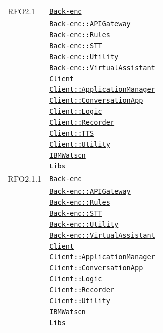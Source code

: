 \begin{longtable}{|>{\centering}m{3cm}|m{10cm}<{\centering}|}
RFO2.1 & \hyperref[Back-end]{\texttt{Back-end}}\\
& \hyperref[Back-end::APIGateway]{\texttt{Back-end::APIGateway}}\\
& \hyperref[Back-end::Rules]{\texttt{Back-end::Rules}}\\
& \hyperref[Back-end::STT]{\texttt{Back-end::STT}}\\
& \hyperref[Back-end::Utility]{\texttt{Back-end::Utility}}\\
& \hyperref[Back-end::VirtualAssistant]{\texttt{Back-end::VirtualAssistant}}\\
& \hyperref[Client]{\texttt{Client}}\\
& \hyperref[Client::ApplicationManager]{\texttt{Client::ApplicationManager}}\\
& \hyperref[Client::ConversationApp]{\texttt{Client::ConversationApp}}\\
& \hyperref[Client::Logic]{\texttt{Client::Logic}}\\
& \hyperref[Client::Recorder]{\texttt{Client::Recorder}}\\
& \hyperref[Client::TTS]{\texttt{Client::TTS}}\\
& \hyperref[Client::Utility]{\texttt{Client::Utility}}\\
& \hyperref[IBMWatson]{\texttt{IBMWatson}}\\
& \hyperref[Libs]{\texttt{Libs}}\\ \hline

RFO2.1.1 & \hyperref[Back-end]{\texttt{Back-end}}\\
& \hyperref[Back-end::APIGateway]{\texttt{Back-end::APIGateway}}\\
& \hyperref[Back-end::Rules]{\texttt{Back-end::Rules}}\\
& \hyperref[Back-end::STT]{\texttt{Back-end::STT}}\\
& \hyperref[Back-end::Utility]{\texttt{Back-end::Utility}}\\
& \hyperref[Back-end::VirtualAssistant]{\texttt{Back-end::VirtualAssistant}}\\
& \hyperref[Client]{\texttt{Client}}\\
& \hyperref[Client::ApplicationManager]{\texttt{Client::ApplicationManager}}\\
& \hyperref[Client::ConversationApp]{\texttt{Client::ConversationApp}}\\
& \hyperref[Client::Logic]{\texttt{Client::Logic}}\\
& \hyperref[Client::Recorder]{\texttt{Client::Recorder}}\\
& \hyperref[Client::Utility]{\texttt{Client::Utility}}\\
& \hyperref[IBMWatson]{\texttt{IBMWatson}}\\
& \hyperref[Libs]{\texttt{Libs}}\\ \hline


\end{longtable}
